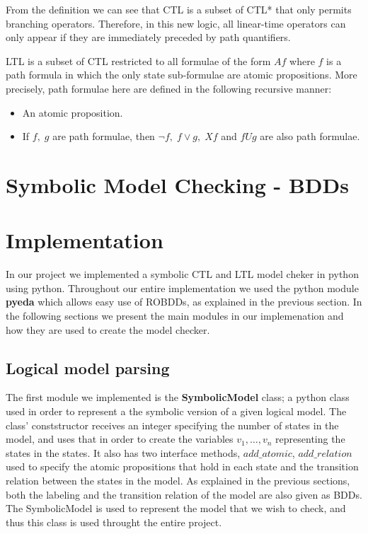 \documentclass[11pt]{article}
\begin{document}
    From the definition we can see that CTL is a subset of CTL* that only permits
    branching operators. Therefore, in this new logic, all linear-time operators
    can only appear if they are immediately preceded by path quantifiers.

    \begin{definition}
        LTL is a subset of CTL restricted to all formulae of the form $Af$ where
        $f$ is a path formula in which the only state sub-formulae are atomic
        propositions\cite{ltl}.
        More precisely, path formulae here are defined in the following recursive
        manner:
        \begin{itemize}
            \item
                An atomic proposition.
            \item
                If $f,\; g$ are path formulae, then $\neg f,\; f\vee g,\;
                Xf$ and $fUg$ are also path formulae.
        \end{itemize}
    \end{definition}


\section{Symbolic Model Checking - BDDs}

\section{Implementation}
    In our project we implemented a symbolic CTL and LTL model cheker in python 
    using python. Throughout our entire implementation we used the python module
    \textbf{pyeda} which allows easy use of ROBDDs, as explained in the previous section.
    In the following sections we present the main modules in our implemenation and how
    they are used to create the model checker.

    \subsection{Logical model parsing}
        The first module we implemented is the \textbf{SymbolicModel} class; 
        a python class used in order to represent a the symbolic version of 
        a given logical model.
        The class' conststructor receives an integer specifying the number of
        states in the model, and uses that in order to create the variables 
        $v_1, \dots, v_n$ representing the states in the states. It also
        has two interface methods, $add\_atomic$, $add\_relation$ used to
        specify the atomic propositions that hold in each state and the
        transition relation between the states in the model. As explained in
        the previous sections, both the labeling and the transition relation
        of the model are also given as BDDs.
        The SymbolicModel is used to represent the model that we wish to check,
        and thus this class is used throught the entire project.
\end{document}

